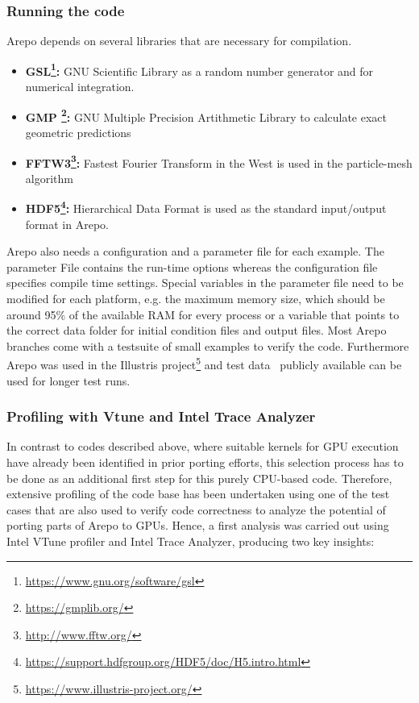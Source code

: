 \documentclass[../main]{subfiles}
\begin{document}
\subsubsection{Running the code}
Arepo depends on several libraries that are necessary for compilation. 
    \begin{itemize}
        \item{\textbf{GSL\footnote{\url{https://www.gnu.org/software/gsl}}:}} GNU Scientific Library as a random number generator and for numerical integration.
        \item{\textbf{GMP \footnote{\url{https://gmplib.org/}}:}} GNU Multiple Precision Artithmetic Library to calculate exact geometric predictions
        \item{\textbf{FFTW3\footnote{\url{http://www.fftw.org/}}:}} Fastest Fourier Transform in the West is used in the particle-mesh algorithm
        \item{\textbf{HDF5\footnote{\url{https://support.hdfgroup.org/HDF5/doc/H5.intro.html}}:}} Hierarchical Data Format is used as the standard input/output format in Arepo. 
    \end{itemize}
Arepo also needs a configuration and a parameter file for each example. The parameter File contains the run-time options whereas the configuration file specifies compile time settings. Special variables in the parameter file need to be modified for each platform, e.g. the maximum memory size, which should be around 95\% of the available RAM for every process or a variable that points to the correct data folder for initial condition files and output files. Most Arepo branches come with a testsuite of small examples to verify the code. Furthermore Arepo was used in the Illustris project\footnote{\url{https://www.illustris-project.org/}} and test data~\cite{Nelson_2015} publicly available can be used for longer test runs. 

\subsubsection{Profiling with Vtune and Intel Trace Analyzer}
In contrast to codes described above, where suitable kernels for GPU execution have already been identified in prior porting efforts, this selection process has to be done as an additional first step for this purely CPU-based code.
Therefore, extensive profiling of the code base has been undertaken using one of the test cases that are also used to verify code correctness to analyze the potential of porting parts of Arepo to GPUs.
Hence, a first analysis was carried out using Intel VTune profiler and Intel Trace Analyzer, producing two key insights:
\end{document}
